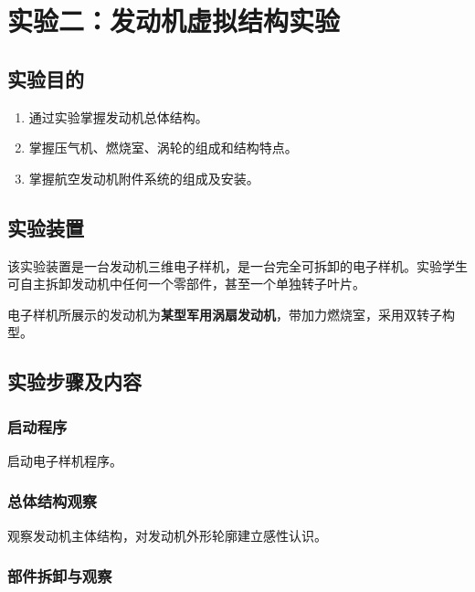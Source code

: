 \section{实验二：发动机虚拟结构实验}

\subsection{实验目的}

\begin{enumerate}
    \item 通过实验掌握发动机总体结构。
    \item 掌握压气机、燃烧室、涡轮的组成和结构特点。
    \item 掌握航空发动机附件系统的组成及安装。
\end{enumerate}

\subsection{实验装置}

该实验装置是一台发动机三维电子样机，是一台完全可拆卸的电子样机。实验学生可自主拆卸发动机中任何一个零部件，甚至一个单独转子叶片。

电子样机所展示的发动机为\textbf{某型军用涡扇发动机}，带加力燃烧室，采用双转子构型。

\subsection{实验步骤及内容}

\subsubsection{启动程序}

启动电子样机程序。

\subsubsection{总体结构观察}

观察发动机主体结构，对发动机外形轮廓建立感性认识。

\subsubsection{部件拆卸与观察}

